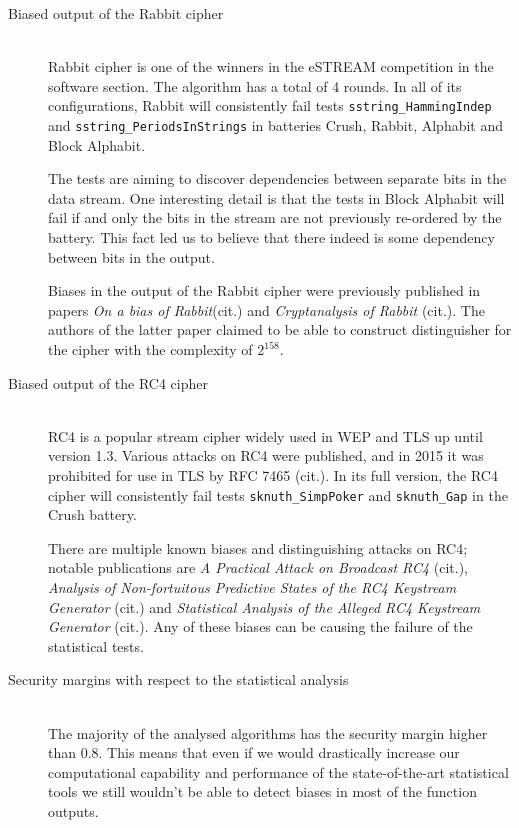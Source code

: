 \documentclass[
  digital,  	%
  color,		%
  oneside,   	%
  12pt,
  nocover,
  notable,
  nolof,
  nolot,
]{fithesis3}
\theoremstyle{definition}
\theoremstyle{remark}
\begin{document}
\begin{description}
\item[Biased output of the Rabbit cipher] \hfill \\
Rabbit cipher is one of the winners in the eSTREAM competition in the software section. The algorithm has a total of 4 rounds. In all of its configurations, Rabbit will consistently fail tests \texttt{sstring\_HammingIndep} and \texttt{sstring\_PeriodsInStrings} in batteries Crush, Rabbit, Alphabit and Block Alphabit. 

The tests are aiming to discover dependencies between separate bits in the data stream. One interesting detail is that the tests in Block Alphabit will fail if and only the bits in the stream are not previously re-ordered by the battery. This fact led us to believe that there indeed is some dependency between bits in the output.

Biases in the output of the Rabbit cipher were previously published in papers \textit{On a bias of Rabbit}(cit.) and \textit{Cryptanalysis of Rabbit} (cit.). The authors of the latter paper claimed to be able to construct distinguisher for the cipher with the complexity of $2^{158}$.

\item[Biased output of the RC4 cipher] \hfill \\
RC4 is a popular stream cipher widely used in WEP and TLS up until version 1.3. Various attacks on RC4 were published, and in 2015 it was prohibited for use in TLS by RFC 7465 (cit.). In its full version, the RC4 cipher will consistently fail tests \texttt{sknuth\_SimpPoker} and \texttt{sknuth\_Gap} in the Crush battery.

There are multiple known biases and distinguishing attacks on RC4; notable publications are \textit{A Practical Attack on Broadcast RC4} (cit.), \textit{Analysis of Non-fortuitous Predictive States of the RC4 Keystream Generator} (cit.) and \textit{Statistical Analysis of the Alleged RC4 Keystream Generator} (cit.). Any of these biases can be causing the failure of the statistical tests.

\item[Security margins with respect to the statistical analysis] \hfill \\
The majority of the analysed algorithms has the security margin higher than 0.8. This means that even if we would drastically increase our computational capability and performance of the state-of-the-art statistical tools we still wouldn't be able to detect biases in most of the function outputs. 


\end{description}
\end{document}
